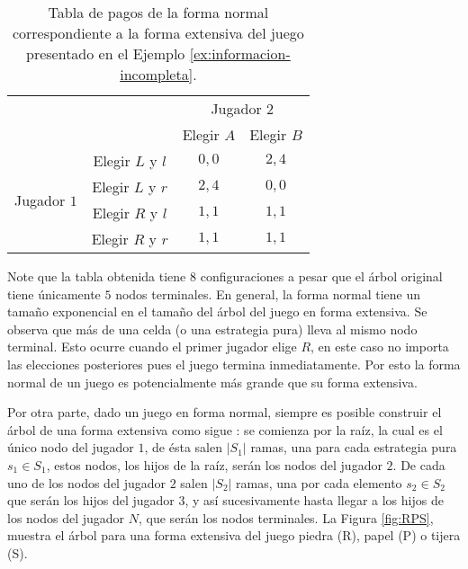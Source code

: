 \begin{table}[h]
\begin{center}
\caption[Forma normal de un juego en forma extensiva]{Tabla de pagos de la forma normal correspondiente a la forma extensiva del juego presentado en el Ejemplo \ref{ex:informacion-incompleta}.}
\label{table:fextensiva-a-fnormal}
\begin{tabular}{c c|c|c|}
\multicolumn{2}{c}{} & \multicolumn{2}{c}{Jugador $2$} \\ 
\multicolumn{2}{c}{} & \multicolumn{1}{c}{Elegir $A$} & \multicolumn{1}{c}{Elegir $B$} \\ \cline{3-4}
\multirow{4}{*}{Jugador $1$} & Elegir $L$ y $l$ & $0,0$ & $2,4$ \\ \cline{3-4}
& Elegir $L$ y $r$ & $2,4$ & $0,0$ \\ \cline{3-4}
& Elegir $R$ y $l$ & $1,1$ & $1,1$ \\ \cline{3-4}
& Elegir $R$ y $r$ & $1,1$ & $1,1$ \\ \cline{3-4}
\end{tabular}
\end{center}
\end{table}

Note que la tabla obtenida tiene $8$ configuraciones a pesar que el árbol original tiene únicamente $5$ nodos terminales. En general, la forma normal tiene un tamaño exponencial en el tamaño del árbol del juego en forma extensiva. Se observa que más de una celda (o una estrategia pura) lleva al mismo nodo terminal. Esto ocurre cuando el primer jugador elige $R$, en este caso no importa las elecciones posteriores pues el juego termina inmediatamente. Por esto la forma normal de un juego es potencialmente más grande que su forma extensiva.

Por otra parte, dado un juego en forma normal, siempre es posible construir el árbol de una forma extensiva como sigue \cite{bib:conceptos-basicos}: se comienza por la raíz, la cual es el único nodo del jugador $1$, de ésta salen $|S_1|$ ramas, una para cada estrategia pura $s_1 \in S_1$, estos nodos, los hijos de la raíz, serán los nodos del jugador $2$. De cada uno de los nodos del jugador $2$ salen $|S_2|$ ramas, una por cada elemento $s_2 \in S_2$ que serán los hijos del jugador $3$, y así sucesivamente hasta llegar a los hijos de los nodos del jugador $N$, que serán los nodos terminales. La Figura \ref{fig:RPS}, muestra el árbol para una forma extensiva del juego piedra (R), papel (P) o tijera (S).

